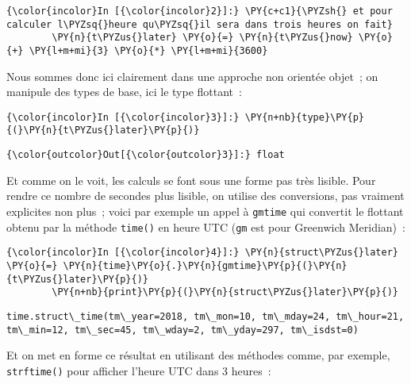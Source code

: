     \begin{Verbatim}[commandchars=\\\{\}]
{\color{incolor}In [{\color{incolor}2}]:} \PY{c+c1}{\PYZsh{} et pour calculer l\PYZsq{}heure qu\PYZsq{}il sera dans trois heures on fait}
        \PY{n}{t\PYZus{}later} \PY{o}{=} \PY{n}{t\PYZus{}now} \PY{o}{+} \PY{l+m+mi}{3} \PY{o}{*} \PY{l+m+mi}{3600}
\end{Verbatim}


    Nous sommes donc ici clairement dans une approche non orientée objet~;
on manipule des types de base, ici le type flottant~:

    \begin{Verbatim}[commandchars=\\\{\}]
{\color{incolor}In [{\color{incolor}3}]:} \PY{n+nb}{type}\PY{p}{(}\PY{n}{t\PYZus{}later}\PY{p}{)}
\end{Verbatim}


\begin{Verbatim}[commandchars=\\\{\}]
{\color{outcolor}Out[{\color{outcolor}3}]:} float
\end{Verbatim}
            
    Et comme on le voit, les calculs se font sous une forme pas très
lisible. Pour rendre ce nombre de secondes plus lisible, on utilise des
conversions, pas vraiment explicites non plus~; voici par exemple un
appel à \texttt{gmtime} qui convertit le flottant obtenu par la méthode
\texttt{time()} en heure UTC (\texttt{gm} est pour Greenwich Meridian)~:

    \begin{Verbatim}[commandchars=\\\{\}]
{\color{incolor}In [{\color{incolor}4}]:} \PY{n}{struct\PYZus{}later} \PY{o}{=} \PY{n}{time}\PY{o}{.}\PY{n}{gmtime}\PY{p}{(}\PY{n}{t\PYZus{}later}\PY{p}{)}
        \PY{n+nb}{print}\PY{p}{(}\PY{n}{struct\PYZus{}later}\PY{p}{)}
\end{Verbatim}


    \begin{Verbatim}[commandchars=\\\{\}]
time.struct\_time(tm\_year=2018, tm\_mon=10, tm\_mday=24, tm\_hour=21, tm\_min=12, tm\_sec=45, tm\_wday=2, tm\_yday=297, tm\_isdst=0)

    \end{Verbatim}

    Et on met en forme ce résultat en utilisant des méthodes comme, par
exemple, \texttt{strftime()} pour afficher l'heure UTC dans 3 heures~:

